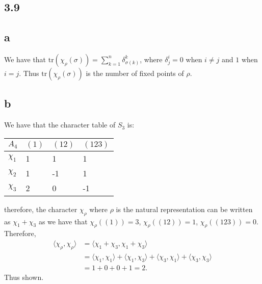\documentclass[]{article}
\newcommand{\tr}{\text{tr}}
\begin{document}
\subsection*{3.9}
\subsection*{a}
We have that $ \tr(\chi_\rho(\sigma)) = \sum_{k = 1}^n \delta_{\sigma(k)}^k$, where $\delta^i_j = 0$ when $i \neq j$ and $1$ when $i = j$. Thus $\tr(\chi_\rho(\sigma))$ is the number of fixed points of $\rho$. 
\subsection*{b}
We have that the character table of $S_3$ is:
\begin{table}[h!]
	\centering
	\begin{tabular}{|l|l|l|l|}
		\hline
		$A_4$    & $(1)$ & $(12)$ & $(123)$ \\ \hline
		$\chi_1$ & 1     & 1      & 1      \\ \hline
		$\chi_2$ & 1     & -1     & 1      \\ \hline
		$\chi_3$ & 2     & 0      & -1     \\ \hline
	\end{tabular}
\end{table}
therefore, the character $\chi_\rho$ where $\rho$ is the natural representation can be written as $\chi_1 + \chi_3$ as we have that $\chi_\rho((1)) = 3$, $\chi_\rho((12)) = 1$, $\chi_\rho((123)) = 0$. Therefore,
\begin{align*}
	\langle \chi_\rho, \chi_\rho \rangle &= \langle \chi_1 + \chi_3, \chi_1 + \chi_3 \rangle\\
	&= \langle \chi_1, \chi_1 \rangle + \langle \chi_1, \chi_3 \rangle + \langle \chi_3, \chi_1 \rangle + \langle \chi_3, \chi_3 \rangle\\
	&= 1 + 0 + 0  + 1 = 2. 
\end{align*}
Thus shown.
\end{document}
